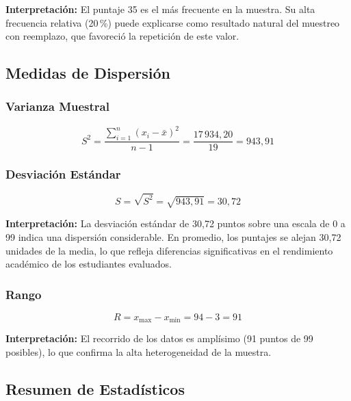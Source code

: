 \documentclass[12pt,a4paper]{article}
\begin{document}
\textbf{Interpretación:} El puntaje 35 es el más frecuente en la muestra. Su alta frecuencia
relativa (20\,\%) puede explicarse como resultado natural del muestreo con reemplazo, que
favoreció la repetición de este valor.

\subsection{Medidas de Dispersión}

\subsubsection{Varianza Muestral}

\begin{equation}
  S^2 = \frac{\sum_{i=1}^{n}(x_i - \bar{x})^2}{n-1}
       = \frac{17\,934{,}20}{19} = 943{,}91
\end{equation}

\subsubsection{Desviación Estándar}

\begin{equation}
  S = \sqrt{S^2} = \sqrt{943{,}91} = 30{,}72
\end{equation}

\textbf{Interpretación:} La desviación estándar de 30,72 puntos sobre una escala de 0 a 99
indica una dispersión considerable. En promedio, los puntajes se alejan 30,72 unidades de la
media, lo que refleja diferencias significativas en el rendimiento académico de los estudiantes
evaluados.

\subsubsection{Rango}

\begin{equation}
  R = x_{\max} - x_{\min} = 94 - 3 = 91
\end{equation}

\textbf{Interpretación:} El recorrido de los datos es amplísimo (91 puntos de 99 posibles),
lo que confirma la alta heterogeneidad de la muestra.

\subsection{Resumen de Estadísticos}
\end{document}
